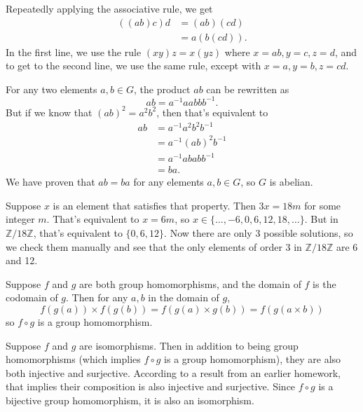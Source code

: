 \documentclass[12pt]{article}
\begin{document}
Repeatedly applying the associative rule, we get
\begin{align*}
    ((ab)c)d &= (ab)(cd) \\
             &= a(b(cd)).
\end{align*}
In the first line, we use the rule $(xy)z=x(yz)$ where $x=ab, y=c, z=d$, and to get to the second line, we use the same rule, except with $x=a, y=b, z=cd$.

\bigskip
\noindent{}\bigskip

For any two elements $a,b \in G$, the product $ab$ can be rewritten as
\[ ab = a^{-1} aabb b^{-1}. \]
But if we know that $(ab)^2 = a^2b^2$, then that's equivalent to
\begin{align*}
    ab &= a^{-1} a^2 b^2 b^{-1} \\
       &= a^{-1} (ab)^2 b^{-1} \\
       &= a^{-1} abab b^{-1} \\
       &= ba.
\end{align*}
We have proven that $ab=ba$ for any elements $a,b \in G$, so $G$ is abelian.

\bigskip
\noindent{}\bigskip

Suppose $x$ is an element that satisfies that property. Then $3x = 18m$ for some integer $m$. That's equivalent to $x=6m$, so $x \in \{ \dots, -6, 0, 6, 12, 18, \dots \}$. But in $\mathbb{Z}/18\mathbb{Z}$, that's equivalent to $\{ 0, 6, 12 \}$. Now there are only 3 possible solutions, so we check them manually and see that the only elements of order 3 in $\mathbb{Z}/18\mathbb{Z}$ are 6 and 12.

\bigskip
\noindent{}\bigskip

Suppose $f$ and $g$ are both group homomorphisms, and the domain of $f$ is the codomain of $g$. Then for any $a, b$ in the domain of $g$,
\[ f(g(a)) \times f(g(b)) = f(g(a) \times g(b)) = f(g(a \times b)) \]
so $f \circ g$ is a group homomorphism.
\par
Suppose $f$ and $g$ are isomorphisms. Then in addition to being group homomorphisms (which implies $f \circ g$ is a group homomorphism), they are also both injective and surjective. According to a result from an earlier homework, that implies their composition is also injective and surjective. Since $f \circ g$ is a bijective group homomorphism, it is also an isomorphism.
\end{document}
